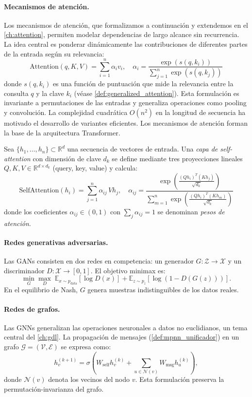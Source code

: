 \paragraph{Mecanismos de atención.}\label{par:atencion_arquitecturas}
Los mecanismos de atención, que formalizamos a continuación y extendemos en el \autoref{ch:attention}, permiten modelar dependencias de largo alcance sin recurrencia. La idea central es ponderar dinámicamente las contribuciones de diferentes partes de la entrada según su relevancia:
\[
	\text{Attention}(q, K, V) = \sum_{i=1}^n \alpha_i v_i, \quad \alpha_i = \frac{\exp(s(q, k_i))}{\sum_{j=1}^n \exp(s(q, k_j))}
\]
donde $s(q, k_i)$ es una función de puntuación que mide la relevancia entre la consulta $q$ y la clave $k_i$ (véase \autoref{def:generalized_attention}). Esta formulación es invariante a permutaciones de las entradas y generaliza operaciones como pooling y convolución. La complejidad cuadrática $O(n^2)$ en la longitud de secuencia ha motivado el desarrollo de variantes eficientes. Los mecanismos de atención forman la base de la arquitectura \gls{Transformer}.

\begin{definition}\label{def:self_attention_basica}
Sea $\{h_1, \ldots, h_n\} \subset \mathbb{R}^d$ una secuencia de vectores de entrada. Una \textit{capa de self-attention} con dimensión de clave $d_k$ se define mediante tres proyecciones lineales $Q, K, V \in \mathbb{R}^{d \times d_k}$ (query, key, value) y calcula:
\[
\mathrm{SelfAttention}(h_i) = \sum_{j=1}^n \alpha_{ij}\, V h_j, \quad \alpha_{ij} = \frac{\exp\!\left(\frac{(Qh_i)^T(Kh_j)}{\sqrt{d_k}}\right)}{\sum_{m=1}^n \exp\!\left(\frac{(Qh_i)^T(Kh_m)}{\sqrt{d_k}}\right)}
\]
donde los coeficientes $\alpha_{ij} \in (0,1)$ con $\sum_j \alpha_{ij} = 1$ se denominan \textit{pesos de atención}.
\end{definition}

\paragraph{Redes generativas adversarias.}
Las \glspl{GAN} consisten en dos redes en competencia: un generador $G: \mathcal{Z} \to \mathcal{X}$ y un discriminador $D: \mathcal{X} \to [0,1]$. El objetivo minimax es:
\[
	\min_G \max_D\; \mathbb{E}_{x \sim p_{\text{data}}}[\log D(x)] + \mathbb{E}_{z \sim p_z}[\log(1 - D(G(z)))].
\]
En el equilibrio de Nash, $G$ genera muestras indistinguibles de los datos reales.

\paragraph{Redes de grafos.}
Las \glspl{GNN} generalizan las operaciones neuronales a datos no euclidianos, un tema central del \autoref{ch:gdl}. La propagación de mensajes (\autoref{def:mpnn_unificador}) en un grafo $\mathcal{G} = (\mathcal{V}, \mathcal{E})$ se expresa como:
\[
	h_v^{(k+1)} = \sigma\!\left(W_{\text{self}}h_v^{(k)} + \sum_{u \in \mathcal{N}(v)} W_{\text{msg}}h_u^{(k)}\right),
\]
donde $\mathcal{N}(v)$ denota los vecinos del nodo $v$. Esta formulación preserva la permutación-invarianza del grafo.

